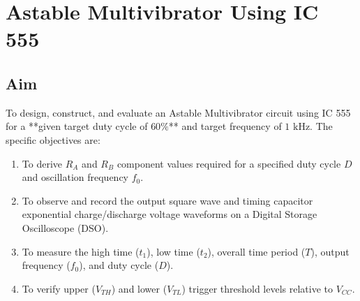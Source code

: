 
\chapter{Astable Multivibrator Using IC 555}

\section{Aim}
To design, construct, and evaluate an Astable Multivibrator circuit using IC 555 for a **given target duty cycle of $60\%$** and target frequency of $1\text{ kHz}$. The specific objectives are:
\begin{enumerate}
	\item To derive $R_A$ and $R_B$ component values required for a specified duty cycle $D$ and oscillation frequency $f_0$.
	\item To observe and record the output square wave and timing capacitor exponential charge/discharge voltage waveforms on a Digital Storage Oscilloscope (DSO).
	\item To measure the high time ($t_1$), low time ($t_2$), overall time period ($T$), output frequency ($f_0$), and duty cycle ($D$).
	\item To verify upper ($V_{TH}$) and lower ($V_{TL}$) trigger threshold levels relative to $V_{CC}$.
\end{enumerate}


